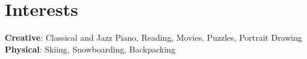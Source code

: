 \documentclass[letterpaper,11pt]{article}
\begin{document}
\section{Interests}
 \begin{itemize}[leftmargin=0.15in, label={}]
    \small{\item{
    \textbf{Creative}{: Classical and Jazz Piano, Reading, Movies, Puzzles, Portrait Drawing} \\
    \textbf{Physical}{: Skiing, Snowboarding, Backpacking} \\
    }}
 \end{itemize}
\end{document}
